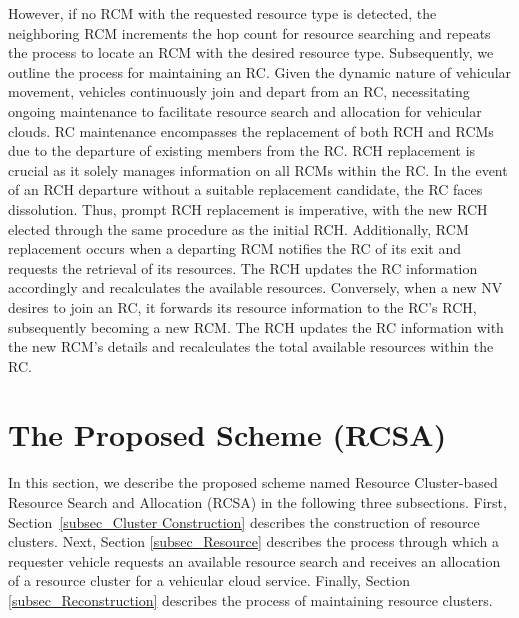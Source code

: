 \documentclass[sensors,article,accept,moreauthors,pdftex]{Definitions/mdpi}
\begin{document}
However, if no RCM with the requested resource type is detected, the neighboring RCM increments the hop count for resource searching and repeats the process to locate an RCM with the desired resource type.
Subsequently, we outline the process for maintaining an RC. Given the dynamic nature of vehicular movement, vehicles continuously join and depart from an RC, necessitating ongoing maintenance to facilitate resource search and allocation for vehicular clouds.
RC maintenance encompasses the replacement of both RCH and RCMs due to the departure of existing members from the RC. RCH replacement is crucial as it solely manages information on all RCMs within the RC. In the event of an RCH departure without a suitable replacement candidate, the RC faces dissolution. Thus, prompt RCH replacement is imperative, with the new RCH elected through the same procedure as the initial RCH.
Additionally, RCM replacement occurs when a departing RCM notifies the RC of its exit and requests the retrieval of its resources. The RCH updates the RC information accordingly and recalculates the available resources. Conversely, when a new NV desires to join an RC, it forwards its resource information to the RC's RCH, subsequently becoming a new RCM. The RCH updates the RC information with the new RCM's details and recalculates the total available resources within the RC.

\section{The Proposed Scheme (RCSA)} \label{sec.prop}
In this section, we describe the proposed scheme named Resource Cluster-based Resource Search and Allocation (RCSA) in the following three subsections.
First, Section~\ref{subsec_Cluster Construction} describes the construction of resource clusters.
Next, Section \ref{subsec_Resource} describes the process through which a requester vehicle requests an available resource search and receives an allocation of a resource cluster for a vehicular cloud service.
Finally, Section \ref{subsec_Reconstruction} describes the process of maintaining resource clusters.
\end{document}
